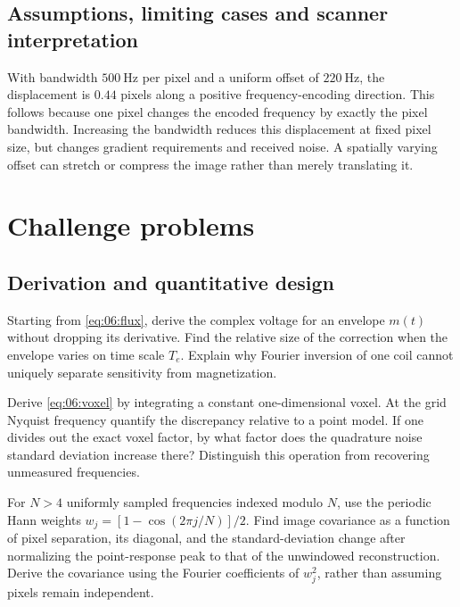 \subsection{Assumptions, limiting cases and scanner interpretation}
\begin{workedexample}
With bandwidth \(\SI{500}{\hertz}\) per pixel and a uniform offset of \(\SI{220}{\hertz}\), the displacement is \(0.44\) pixels along a positive frequency-encoding direction.
This follows because one pixel changes the encoded frequency by exactly the pixel bandwidth.
Increasing the bandwidth reduces this displacement at fixed pixel size, but changes gradient requirements and received noise. A spatially varying offset can stretch or compress the image rather than merely translating it.
\end{workedexample}

\section{Challenge problems}
\label{sec:06:challenge-problems}
\subsection{Derivation and quantitative design}
\begin{challengeproblem}\label{prob:06:receive}
Starting from \cref{eq:06:flux}, derive the complex voltage for an envelope \(m(t)\) without dropping its derivative.
Find the relative size of the correction when the envelope varies on time scale \(T_e\).
Explain why Fourier inversion of one coil cannot uniquely separate sensitivity from magnetization.
\end{challengeproblem}
\begin{challengeproblem}\label{prob:06:voxel}
Derive \cref{eq:06:voxel} by integrating a constant one-dimensional voxel.
At the grid Nyquist frequency quantify the discrepancy relative to a point model.
If one divides out the exact voxel factor, by what factor does the quadrature noise standard deviation increase there? Distinguish this operation from recovering unmeasured frequencies.
\end{challengeproblem}
\begin{challengeproblem}\label{prob:06:window}
For \(N>4\) uniformly sampled frequencies indexed modulo \(N\), use the periodic Hann weights
\(w_j=[1-\cos(2\pi j/N)]/2\).
Find image covariance as a function of pixel separation, its diagonal, and the standard-deviation change after normalizing the point-response peak to that of the unwindowed reconstruction.
Derive the covariance using the Fourier coefficients of \(w_j^2\), rather than assuming pixels remain independent.
\end{challengeproblem}
